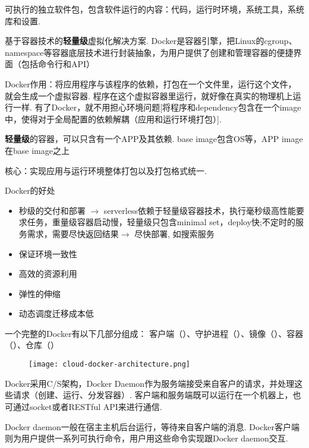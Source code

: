 \begin{definition}[镜像]
    可执行的独立软件包，包含软件运行的内容：代码，运行时环境，系统工具，系统库和设置. 
\end{definition}

\begin{definition}[Docker]
    基于容器技术的\textbf{轻量级}虚拟化解决方案. Docker是容器引擎，把Linux的cgroup、namespace等容器底层技术进行封装抽象，为用户提供了创建和管理容器的便捷界面（包括命令行和API）

\end{definition}

Docker作用：将应用程序与该程序的依赖，打包在一个文件里，运行这个文件，就会生成一个虚拟容器. 程序在这个虚拟容器里运行，就好像在真实的物理机上运行一样. 有了Docker，就不用担心环境问题[将程序和dependency包含在一个image中，使得对于全局配置的依赖解耦（应用和运行环境打包）]. 

\textbf{轻量级}的容器，可以只含有一个APP及其依赖. base image包含OS等，APP image在base image之上

核心：实现应用与运行环境整体打包以及打包格式统一. 

Docker的好处

\begin{itemize}
    \item 秒级的交付和部署 $\rightarrow$ serverless依赖于轻量级容器技术，执行毫秒级高性能要求任务，重量级容器启动慢，轻量级只包含minimal set，deploy快;不定时的服务需求，需要尽快返回结果$\rightarrow$ 尽快部署, 如搜索服务
    \item 保证环境一致性
    \item 高效的资源利用
    \item 弹性的伸缩
    \item 动态调度迁移成本低
\end{itemize}

一个完整的Docker有以下几部分组成：
客户端（）、守护进程（）、镜像（）、容器（）、仓库（）

\begin{figure}[htbp]
    \centering
    \texttt{[image: cloud-docker-architecture.png]}
\end{figure}

Docker采用C/S架构，Docker Daemon作为服务端接受来自客户的请求，并处理这些请求（创建、运行、分发容器）. 客户端和服务端既可以运行在一个机器上，也可通过socket或者RESTful API来进行通信. 

Docker daemon一般在宿主主机后台运行，等待来自客户端的消息. Docker客户端则为用户提供一系列可执行命令，用户用这些命令实现跟Docker daemon交互. 

